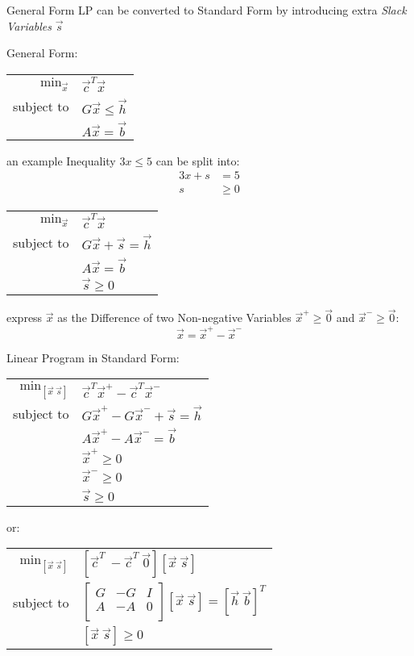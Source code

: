 General Form LP can be converted to Standard Form by introducing extra
\emph{Slack Variables} $\vec{s}$

General Form:

\begin{tabular}{r l}
  $\mathrm{min}_{\vec{x}}$ & $\vec{c}^T\vec{x}$     \\
  subject to               & $G\vec{x} \leq \vec{h}$   \\
                           & $A\vec{x} = \vec{b}$ \\
\end{tabular}

an example Inequality $3x \leq 5$ can be split into:
\begin{align*}
  3x + s & = 5 \\
  s      & \geq 0
\end{align*}

\begin{tabular}{r l}
  $\mathrm{min}_{\vec{x}}$ & $\vec{c}^T\vec{x}$     \\
  subject to               & $G\vec{x} + \vec{s} = \vec{h}$   \\
                           & $A\vec{x} = \vec{b}$ \\
                           & $\vec{s} \geq 0$ \\
\end{tabular}

express $\vec{x}$ as the Difference of two Non-negative Variables $\vec{x}^+
\geq \vec{0}$ and $\vec{x}^- \geq \vec{0}$:
\[
  \vec{x} = \vec{x}^+ - \vec{x}^-
\]

Linear Program in Standard Form:

\begin{tabular}{r l}
  $\mathrm{min}_{[\vec{x} \ \vec{s}]}$ &
    $\vec{c}^T\vec{x}^+ - \vec{c}^T\vec{x}^-$     \\
  subject to               & $G\vec{x}^+ - G\vec{x}^- + \vec{s} = \vec{h}$   \\
                           & $A\vec{x}^+ - A\vec{x}^- = \vec{b}$ \\
                           & $\vec{x}^+ \geq 0$ \\
                           & $\vec{x}^- \geq 0$ \\
                           & $\vec{s}   \geq 0$ \\
\end{tabular}

or:

\begin{tabular}{r l}
  $\mathrm{min}_{[\vec{x} \ \vec{s}]}$ &
    $[\vec{c}^T \ -\vec{c}^T \ \vec{0}] [\vec{x} \ \vec{s}]$ \\
  subject to               &
    $\begin{bmatrix} G & -G & I \\ A & -A & 0 \\ \end{bmatrix}
      [\vec{x} \ \vec{s}] = [\vec{h} \ \vec{b}]^T$   \\
                           & $[\vec{x} \ \vec{s}] \geq 0$ \\
\end{tabular}


